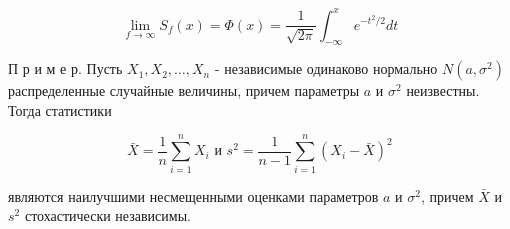 \documentclass[10pt]{article}
\begin{document}
\[

\lim _{f \rightarrow \infty} S_{f}(x)=\Phi(x)=\frac{1}{\sqrt{2 \pi}} \int_{-\infty}^{x} e^{-t^{2} / 2} d t

\]



П р и м е р. Пусть $X_{1}, X_{2}, \ldots, X_{n}$ - независимые одинаково нормально $N\left(a, \sigma^{2}\right)$ распределенные случайные величины, причем параметры $a$ и $\sigma^{2}$ неизвестны. Тогда статистики



\[

\bar{X}=\frac{1}{n} \sum_{i=1}^{n} X_{i} \text { и } s^{2}=\frac{1}{n-1} \sum_{i=1}^{n}\left(X_{i}-\bar{X}\right)^{2}

\]



являются наилучшими несмещенными оценками параметров $a$ и $\sigma^{2}$, причем $\bar{X}$ и $s^{2}$ стохастически независимы.
\end{document}
